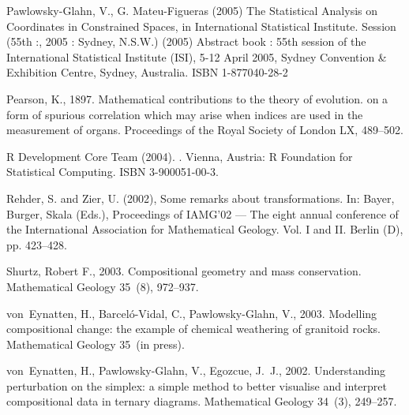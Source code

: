 \documentclass{article}
\begin{document}
\begin{thebibliography}{99}
 Pawlowsky-Glahn,
  V., G. Mateu-Figueras (2005) The Statistical Analysis on Coordinates in
  Constrained Spaces, in International Statistical Institute.  Session (55th
  :, 2005 : Sydney, N.S.W.) (2005) Abstract book : 55th session of the
  International Statistical Institute (ISI), 5-12 April 2005, Sydney
  Convention \& Exhibition Centre, Sydney, Australia. ISBN 1-877040-28-2

Pearson, K., 1897. Mathematical contributions to the theory of
evolution. on a form of spurious correlation which may arise when
indices are used in the measurement of organs. Proceedings of the
Royal Society of London LX, 489--502.

{R Development Core Team} (2004).
.
\newblock Vienna, Austria: R Foundation for Statistical Computing.
\newblock ISBN 3-900051-00-3.

Rehder, S. and Zier, U. (2002),
Some remarks about transformations. In: Bayer, Burger, Skala
  (Eds.), Proceedings of IAMG'02 --- The eight annual conference of the
  International Association for Mathematical Geology. Vol. I and II. Berlin (D), pp. 423--428.

Shurtz, Robert F., 2003. Compositional geometry and mass conservation.
Mathematical Geology 35~(8), 972--937.

{von}~Eynatten, H., Barcel{\'o}-Vidal, C., Pawlowsky-Glahn, V.,
2003. Modelling compositional change: the example of chemical weathering of
granitoid rocks. Mathematical Geology 35~(in press).

{von}~Eynatten, H., Pawlowsky-Glahn, V., Egozcue, J.~J., 2002.
 Understanding perturbation on the simplex: a simple method to better visualise
 and interpret compositional data in ternary diagrams.
 Mathematical Geology 34~(3), 249--257.

\end{thebibliography}
\end{document}
